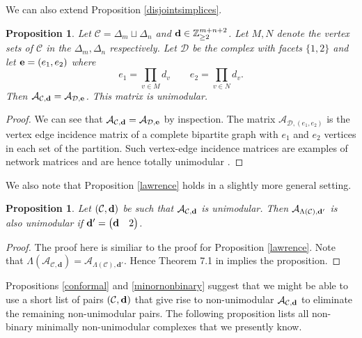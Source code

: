 \documentclass[letterpaper,12pt]{amsart}
\theoremstyle{plain}
\newtheorem{prop}[thm]{Proposition}
\theoremstyle{definition}
\theoremstyle{remark}
\newcommand{\zz}{\mathbb{Z}}
\newcommand{\bfd}{\mathbf{d}}
\newcommand{\calc}{\mathcal{C}}
\begin{document}
We can also extend Proposition \ref{disjointsimplices}.

\begin{prop}\label{disjointnonbinary}
	Let $\mathcal{C} = \Delta_m \sqcup \Delta_n$ and ${\bf d} \in \zz_{\ge 2}^{m+n+2}$.
	Let $M,N$ denote the vertex sets of $\mathcal{C}$ in the $\Delta_m,\Delta_n$ respectively.
	Let $\mathcal{D}$ be the complex with facets $\{1,2\}$ and let ${\bf e} = (e_1,e_2)$ where
	\[
		e_1 = \prod_{v \in M} d_v \qquad e_2 = \prod_{v \in N}d_v.
	\]
	Then $\mathcal{A}_{\mathcal{C},{\bf d}} = \mathcal{A}_{\mathcal{D},{\bf e}}$.
	This matrix is unimodular.
\end{prop}
\begin{proof}
	We can see that $\mathcal{A}_{\mathcal{C},{\bf d}} = \mathcal{A}_{\mathcal{D},{\bf e}}$ by inspection.
	The matrix $\mathcal{A}_{\mathcal{D},(e_1,e_2)}$ is the vertex edge incidence matrix of a complete bipartite
	graph with $e_1$ and $e_2$ vertices in each set of the partition.
	Such vertex-edge incidence matrices are
	examples of network matrices and are hence totally unimodular \cite[Ch.~19]{Schrijver1986}.
\end{proof}


We also note that Proposition \ref{lawrence} holds in a slightly more general setting.
\begin{prop}\label{lawrencenonbinary}
	Let $(\mathcal{C},{\bf d})$ be such that $\mathcal{A}_{\mathcal{C},{\bf d}}$ is unimodular.
	Then $\mathcal{A}_{\Lambda(\mathcal{C}),{\bf d}'}$ is also unimodular if ${\bf d}' = \begin{pmatrix} \bfd & 2 \end{pmatrix}$.
\end{prop}
\begin{proof}
	The proof here is similiar to the proof for Proposition \ref{lawrence}.
	Note that $\Lambda(\mathcal{A}_{\calc,\bfd}) = \mathcal{A}_{\Lambda(\calc),\bfd'}$.
	Hence Theorem 7.1 in \cite{sturmfels} implies the proposition.
\end{proof}

Propositions \ref{conformal} and \ref{minornonbinary} suggest that
we might be able to use a short list of pairs $(\mathcal{C},{\bf d})$ that give rise
to non-unimodular $\mathcal{A}_{\mathcal{C},{\bf d}}$ to eliminate the remaining non-unimodular pairs.
The following proposition lists all non-binary minimally non-unimodular complexes
that we presently know.
\end{document}
